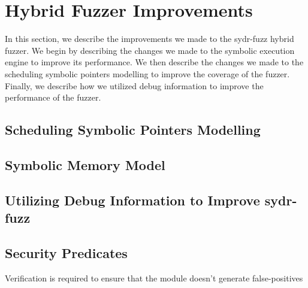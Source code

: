 \section{Hybrid Fuzzer Improvements}

In this section, we describe the improvements we made to the sydr-fuzz hybrid fuzzer. We begin by describing the changes we made to the symbolic execution engine to improve its performance. We then describe the changes we made to the scheduling symbolic pointers modelling to improve the coverage of the fuzzer. Finally, we describe how we utilized debug information to improve the performance of the fuzzer.

\subsection{Scheduling Symbolic Pointers Modelling}

\subsection{Symbolic Memory Model}

\subsection{Utilizing Debug Information to Improve sydr-fuzz}

\subsection{Security Predicates}

Verification is required to ensure that the module doesn't generate false-positives
